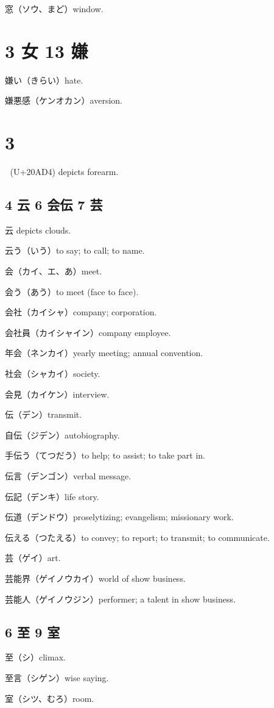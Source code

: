 窓（ソウ、まど）window.

\section{3 女 13 嫌}

嫌い（きらい）hate.

嫌悪感（ケンオカン）aversion.

\section{3 𠫔}

𠫔 (U+20AD4) depicts forearm.

\subsection{4 云 6 会伝 7 芸}

云 depicts clouds.

云う（いう）to say; to call; to name.

会（カイ、エ、あ）meet.

会う（あう）to meet (face to face).

会社（カイシャ）company; corporation.

会社員（カイシャイン）company employee.

年会（ネンカイ）yearly meeting; annual convention.

社会（シャカイ）society.

会見（カイケン）interview.

伝（デン）transmit.

自伝（ジデン）autobiography.

手伝う（てつだう）to help; to assist; to take part in.

伝言（デンゴン）verbal message.

伝記（デンキ）life story.

伝道（デンドウ）proselytizing; evangelism; missionary work.

伝える（つたえる）to convey; to report; to transmit; to communicate.

芸（ゲイ）art.

芸能界（ゲイノウカイ）world of show business.

芸能人（ゲイノウジン）performer; a talent in show business.

\subsection{6 至 9 室}

至（シ）climax.

至言（シゲン）wise saying.

室（シツ、むろ）room.
